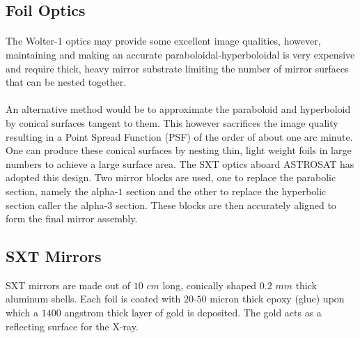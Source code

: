 \documentclass[a4paper,twoside]{report}
\numberwithin{equation}{section}
\begin{document}
\subsection{Foil Optics}
\paragraph{}
The Wolter-$1$ optics may provide some excellent image qualities, however, maintaining and making an accurate paraboloidal-hyperboloidal is very expensive and require thick, heavy mirror substrate limiting the number of mirror surfaces that can be nested together. 
\paragraph{}
An alternative method would be to approximate the paraboloid and hyperboloid by conical surfaces tangent to them. This however sacrifices the image quality resulting in a Point Spread Function (PSF) of the order of about one arc minute. One can produce these conical surfaces by nesting thin, light weight foils in large numbers to achieve a large surface area. The SXT optics aboard ASTROSAT has adopted this design. Two mirror blocks are used, one to replace the parabolic section, namely the alpha-$1$ section and the other to replace the hyperbolic section caller the alpha-$3$ section. These blocks are then accurately aligned to form the final mirror assembly. 
\subsection{SXT Mirrors}
SXT mirrors are made out of $10$ $cm$ long, conically shaped $0.2$ $mm$ thick aluminum shells. Each foil is coated with $20$-$50$ micron thick epoxy (glue) upon which a $1400$ angstrom thick layer of gold is deposited. The gold acts as a reflecting surface for the X-ray. 
\newpage 
\end{document}
